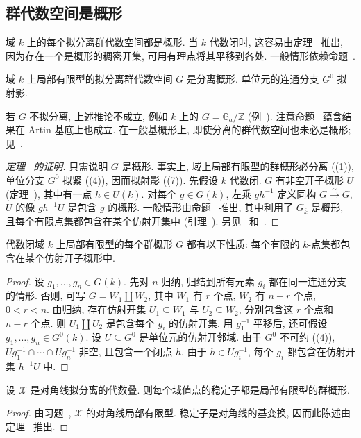 \subsection{群代数空间是概形}\label{src:5.5.6-subsection}
域 $k$ 上的每个拟分离群代数空间都是概形. 当 $k$ 代数闭时, 这容易由定理~ 推出, 因为存在一个是概形的稠密开集, 可用有理点将其平移到各处. 一般情形依赖命题~.
\begin{theorem}\label{src:5.5.28}
域 $k$ 上局部有限型的拟分离群代数空间 $G$ 是分离概形. 单位元的连通分支 $G^0$ 拟射影.
\end{theorem}
\begin{remark}\label{src:5.5.29}
若 $G$ 不拟分离, 上述推论不成立, 例如 $k$ 上的 $G=\mathbb G_a/\mathbb Z$ (例~). 注意命题~ 蕴含结果在 Artin 基底上也成立. 在一般基概形上, 即使分离的群代数空间也未必是概形; 见~\cite[引理 X.14]{Ray70}.
\end{remark}
\begin{proof}[定理~ 的证明]
只需说明 $G$ 是概形. 事实上, 域上局部有限型的群概形必分离 ((1)), 单位分支 $G^0$ 拟紧 ((4)), 因而拟射影 ((7)). 先假设 $k$ 代数闭. $G$ 有非空开子概形 $U$ (定理~), 其中有一点 $h\in U(k)$. 对每个 $g\in G(k)$, 左乘 $gh^{-1}$ 定义同构 $G\xrightarrow{\sim}G$, $U$ 的像 $gh^{-1}U$ 是包含 $g$ 的概形. 一般情形由命题~ 推出, 其中利用了 $G_{\overline k}$ 是概形, 且每个有限点集都包含在某个仿射开集中 (引理~). 另见~\cite[引理 $4.2$]{Art69b} 和~\cite[Tag 0B8D]{SP}.
\end{proof}
\begin{lemma}\label{src:5.5.30}
代数闭域 $k$ 上局部有限型的每个群概形 $G$ 都有以下性质: 每个有限的 $k$-点集都包含在某个仿射开子概形中.
\end{lemma}
\begin{proof}
设 $g_1,\ldots,g_n\in G(k)$. 先对 $n$ 归纳, 归结到所有元素 $g_i$ 都在同一连通分支的情形. 否则, 可写 $G=W_1\amalg W_2$, 其中 $W_1$ 有 $r$ 个点, $W_2$ 有 $n-r$ 个点, $0<r<n$. 由归纳, 存在仿射开集 $U_1\subseteq W_1$ 与 $U_2\subseteq W_2$, 分别包含这 $r$ 个点和 $n-r$ 个点. 则 $U_1\amalg U_2$ 是包含每个 $g_i$ 的仿射开集. 用 $g_1^{-1}$ 平移后, 还可假设 $g_1,\ldots,g_n\in G^0(k)$. 设 $U\subseteq G^0$ 是单位元的仿射开邻域. 由于 $G^0$ 不可约 ((4)), $Ug_1^{-1}\cap\cdots\cap Ug_n^{-1}$ 非空, 且包含一个闭点 $h$. 由于 $h\in Ug_i^{-1}$, 每个 $g_i$ 都包含在仿射开集 $h^{-1}U$ 中.
\end{proof}
\begin{corollary}\label{src:5.5.31}
设 $\mathcal X$ 是对角线拟分离的代数叠. 则每个域值点的稳定子都是局部有限型的群概形.
\end{corollary}
\begin{proof}
由习题~, $\mathcal X$ 的对角线局部有限型. 稳定子是对角线的基变换, 因而此陈述由定理~ 推出.
\end{proof}

